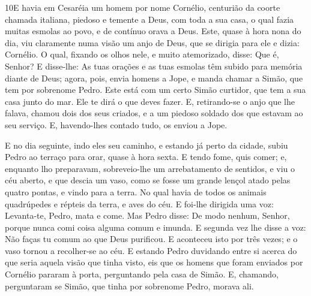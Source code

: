 \lettrine{10} E havia em Cesaréia um homem por nome Cornélio,
centurião da coorte chamada italiana, piedoso e temente a Deus,
com toda a sua casa, o qual fazia muitas esmolas ao povo, e de
contínuo orava a Deus. Este, quase à hora nona do dia, viu
claramente numa visão um anjo de Deus, que se dirigia para ele e
dizia: Cornélio. O qual, fixando os olhos nele, e muito
atemorizado, disse: Que é, Senhor? E disse-lhe: As tuas orações e as
tuas esmolas têm subido para memória diante de Deus; agora,
pois, envia homens a Jope, e manda chamar a Simão, que tem por
sobrenome Pedro. Este está com um certo Simão curtidor, que tem
a sua casa junto do mar. Ele te dirá o que deves fazer. E,
retirando-se o anjo que lhe falava, chamou dois dos seus criados, e
a um piedoso soldado dos que estavam ao seu serviço. E,
havendo-lhes contado tudo, os enviou a Jope.

E no dia seguinte, indo eles seu caminho, e estando já perto da
cidade, subiu Pedro ao terraço para orar, quase à hora sexta.
E tendo fome, quis comer; e, enquanto lho preparavam,
sobreveio-lhe um arrebatamento de sentidos, e viu o céu
aberto, e que descia um vaso, como se fosse um grande lençol atado
pelas quatro pontas, e vindo para a terra. No qual havia de
todos os animais quadrúpedes e répteis da terra, e aves do céu.
E foi-lhe dirigida uma voz: Levanta-te, Pedro, mata e come.
Mas Pedro disse: De modo nenhum, Senhor, porque nunca comi
coisa alguma comum e imunda. E segunda vez lhe disse a voz:
Não faças tu comum ao que Deus purificou. E aconteceu isto
por três vezes; e o vaso tornou a recolher-se ao céu. E
estando Pedro duvidando entre si acerca do que seria aquela visão
que tinha visto, eis que os homens que foram enviados por Cornélio
pararam à porta, perguntando pela casa de Simão. E, chamando,
perguntaram se Simão, que tinha por sobrenome Pedro, morava ali.

